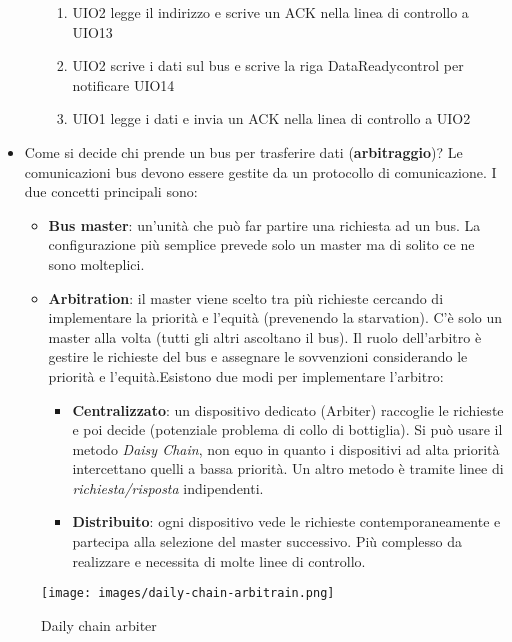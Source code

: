 \begin{itemize}
\begin{itemize}
\begin{enumerate}
        	\item UIO2 legge il indirizzo e scrive un ACK nella linea di controllo a UIO13
        	\item UIO2 scrive i dati sul bus e scrive la riga DataReadycontrol per notificare UIO14
        	\item UIO1 legge i dati e invia un ACK nella linea di controllo a UIO2
        \end{enumerate}
    \end{itemize}
    \item Come si decide chi prende un bus per trasferire dati (\textbf{arbitraggio})? Le comunicazioni bus devono essere gestite da un protocollo di comunicazione. I due concetti principali sono:
    \begin{itemize}
        \item \textbf{Bus master}: un'unità che può far partire una richiesta ad un bus. La configurazione più semplice prevede solo un master ma di solito ce ne sono molteplici.
        \item \textbf{Arbitration}: il master viene scelto tra più richieste cercando di implementare la priorità e l'equità (prevenendo la starvation). C'è solo un master alla volta (tutti gli altri ascoltano il bus). Il ruolo dell'arbitro è gestire le richieste del bus e assegnare le sovvenzioni considerando le priorità e l'equità.Esistono due modi per implementare l'arbitro:
        \begin{itemize}
        	\item \textbf{Centralizzato}: un dispositivo dedicato (Arbiter) raccoglie le richieste e poi decide (potenziale problema di collo di bottiglia). Si può usare il metodo \emph{Daisy Chain}, non equo in quanto i dispositivi ad alta priorità intercettano quelli a bassa priorità. Un altro metodo è tramite linee di \emph{richiesta/risposta} indipendenti.
        	\item \textbf{Distribuito}: ogni dispositivo vede le richieste contemporaneamente e partecipa alla selezione del master successivo. Più complesso da realizzare e necessita di molte linee di controllo.
        \end{itemize}
    \end{itemize}
\end{itemize}

\begin{figure}[h!]
    \centering
    \texttt{[image: images/daily-chain-arbitrain.png]}
    \caption{Daily chain arbiter}
\end{figure}

